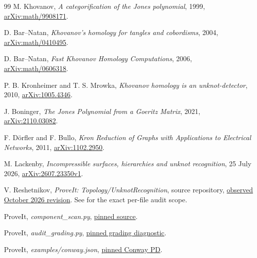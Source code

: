 \documentclass[11pt]{article}
\theoremstyle{definition}
\theoremstyle{remark}
\begin{document}
\clearpage
\begin{thebibliography}{99}
M. Khovanov, \emph{A categorification of the Jones polynomial},
1999, \href{https://arxiv.org/abs/math/9908171}{arXiv:math/9908171}.

D. Bar--Natan, \emph{Khovanov's homology for tangles and cobordisms},
2004, \href{https://arxiv.org/abs/math/0410495}{arXiv:math/0410495}.

D. Bar--Natan, \emph{Fast Khovanov Homology Computations},
2006, \href{https://arxiv.org/abs/math/0606318}{arXiv:math/0606318}.

P. B. Kronheimer and T. S. Mrowka,
\emph{Khovanov homology is an unknot-detector},
2010, \href{https://arxiv.org/abs/1005.4346}{arXiv:1005.4346}.

J. Boninger, \emph{The Jones Polynomial from a Goeritz Matrix},
2021, \href{https://arxiv.org/abs/2110.03082}{arXiv:2110.03082}.

F. D\"orfler and F. Bullo,
\emph{Kron Reduction of Graphs with Applications to Electrical Networks},
2011, \href{https://arxiv.org/abs/1102.2950}{arXiv:1102.2950}.

M. Lackenby, \emph{Incompressible surfaces, hierarchies and unknot recognition},
25 July 2026, \href{https://arxiv.org/html/2607.23350v1}{arXiv:2607.23350v1}.

V. Reshetnikov, \emph{ProveIt: Topology/UnknotRecognition}, source repository,
\href{https://github.com/VladimirReshetnikov/ProveIt/tree/8e5edcedb580523bdd4946233f7d0b42a97901d4/Topology/UnknotRecognition}{observed October 2026 revision}.
See  for the exact per-file audit scope.

ProveIt, \emph{component\_scan.py},
\href{https://github.com/VladimirReshetnikov/ProveIt/blob/8e5edcedb580523bdd4946233f7d0b42a97901d4/Topology/UnknotRecognition/fast/fastunknot/component_scan.py}{pinned source}.

ProveIt, \emph{audit\_grading.py},
\href{https://github.com/VladimirReshetnikov/ProveIt/blob/dfc762327721d9d8040eb62a36a4ab20c005b9e5/Topology/UnknotRecognition/fast/audit_grading.py}{pinned grading diagnostic}.

ProveIt, \emph{examples/conway.json},
\href{https://github.com/VladimirReshetnikov/ProveIt/blob/8e5edcedb580523bdd4946233f7d0b42a97901d4/Topology/UnknotRecognition/fast/examples/conway.json}{pinned Conway PD}.
\end{thebibliography}
\end{document}
